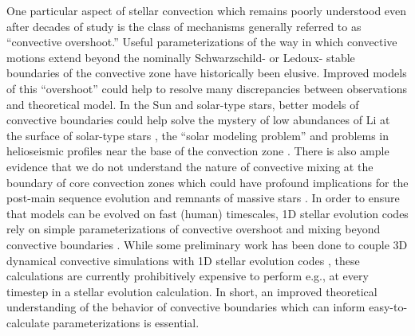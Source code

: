 \documentclass{aastex631}
\begin{document}
One particular aspect of stellar convection which remains poorly understood even after decades of study is the class of mechanisms generally referred to as ``convective overshoot.''
Useful parameterizations of the way in which convective motions extend beyond the nominally Schwarzschild- or Ledoux- stable boundaries of the convective zone have historically been elusive.
Improved models of this ``overshoot'' could help to resolve many discrepancies between observations and theoretical model.
In the Sun and solar-type stars, better models of convective boundaries could help solve the mystery of low abundances of Li at the surface of solar-type stars \citep{pinsonneault1997, carlos_etal_2019, dumont_etal_2021}, the ``solar modeling problem'' \citep{basu_antia_2004, bahcall_etal_2005, zhang_li_2012, vinyoles_etal_2017, asplund_etal_2021} and problems in helioseismic profiles near the base of the convection zone \citep{christensen-dalsgaard_etal_2011}.
There is also ample evidence that we do not understand the nature of convective mixing at the boundary of core convection zones \citep{claret_torres_2018, jermyn_etal_2018, viani_basu_2020, martinet_etal_2021, pedersen_etal_2021} which could have profound implications for the post-main sequence evolution and remnants of massive stars \citet{farmer_etal_2019, higgins_vink_2020}.
In order to ensure that models can be evolved on fast (human) timescales, 1D stellar evolution codes rely on simple parameterizations of convective overshoot and mixing beyond convective boundaries \citep{shaviv_salpeter_1973, maeder1975, herwig2000, paxton_etal_2011, paxton_etal_2013, paxton_etal_2018, paxton_etal_2019}.
While some preliminary work has been done to couple 3D dynamical convective simulations with 1D stellar evolution codes \citep{jorgensen_weiss_2019}, these calculations are currently prohibitively expensive to perform e.g., at every timestep in a stellar evolution calculation.
In short, an improved theoretical understanding of the behavior of convective boundaries which can inform easy-to-calculate parameterizations is essential.
\end{document}
